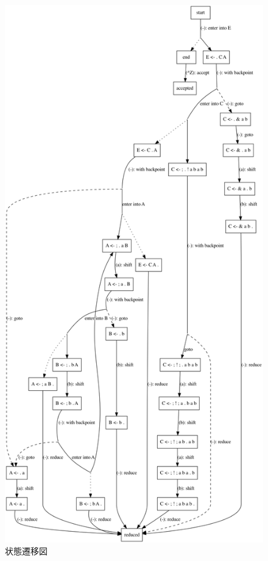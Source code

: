 \begin{figure}
  \centering
  \includegraphics[height=0.9\textheight]{asset/implementation-note-of-peg-parser/sample-grammar.png}
  \caption{状態遷移図}
\end{figure}

